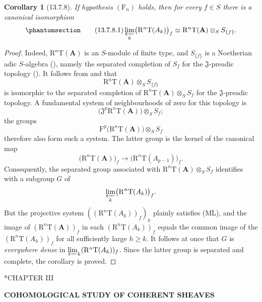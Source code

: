 \documentclass[oneside]{amsart}
\makeatletter
\theoremstyle{ega-env-style}
\theoremstyle{ega-thm-env-style}
\newtheorem*{corollary}{Corollary}
\theoremstyle{ega-defn-env-style}
\def\section{\@startsection{section}{1}%
  \z@{.7\linespacing\@plus\linespacing}{.5\linespacing}%
  {\normalfont\bfseries\Large\scshape\centering}}
\def\bb{\mathbf}                    %
\def\geq{\geqslant}                 %
\def\RR{\mathrm{R}}                 %
\def\isoto{\simeq} %
\newcommand{\oldpage}[2][]{{\marginnote{\normalfont{\textbf{#1}~|~#2}}}\ignorespaces}
\let\EGAOriginalLabel\label
\renewcommand{\label}[1]{\phantomsection\EGAOriginalLabel{#1}}
\makeatother
\begin{document}
\begin{corollary}[13.7.8]
\label{0.13.7.8}
If hypothesis $(\mathrm{F}_n)$ holds, then for every $f\in S$ there
is a canonical isomorphism
\begin{equation}
\label{0.13.7.8.1}
\tag{13.7.8.1}
  \varprojlim_k\bigl(\RR^n\mathrm{T}(A_k)\bigr)_f
  \isoto
  \RR^n\mathrm{T}(\bb{A})\otimes_S S_{\{f\}}.
\end{equation}
\end{corollary}

\begin{proof}
Indeed, $\RR^n\mathrm{T}(\bb{A})$ is an $S$-module of finite type,
and $S_{\{f\}}$ is a Noetherian adic $S$-algebra
(), namely the separated
completion of $S_f$ for the $\mathfrak{J}$-preadic topology
().
It follows from  and
 that
\[
  \RR^n\mathrm{T}(\bb{A})\otimes_S S_{\{f\}}
\]
is isomorphic to the separated completion of
$\RR^n\mathrm{T}(\bb{A})\otimes_S S_f$ for the
$\mathfrak{J}$-preadic topology.
A fundamental system of neighbourhoods of zero for this topology
is
\[
  \bigl(
    \mathfrak{J}^p\RR^n\mathrm{T}(\bb{A})
  \bigr)\otimes_S S_f;
\]
the groups
\[
  \mathrm{F}^p\bigl(\RR^n\mathrm{T}(\bb{A})\bigr)
  \otimes_S S_f
\]
therefore also form such a system.
The latter group is the kernel of the canonical map
\[
  \bigl(\RR^n\mathrm{T}(\bb{A})\bigr)_f
  \longrightarrow
  \bigl(\RR^n\mathrm{T}(A_{p-1})\bigr)_f.
\]
Consequently, the separated group associated with
$\RR^n\mathrm{T}(\bb{A})\otimes_S S_f$ identifies with a subgroup
$G$ of
\[
  \varprojlim_k\bigl(\RR^n\mathrm{T}(A_k)\bigr)_f.
\]
But the projective system
$((\RR^n\mathrm{T}(A_k))_f)_k$ plainly satisfies {\rm(ML)}, and the
image of $(\RR^n\mathrm{T}(\bb{A}))_f$ in each
$(\RR^n\mathrm{T}(A_k))_f$ equals the common image of the
$(\RR^n\mathrm{T}(A_h))_f$ for all sufficiently large $h\geq k$.
It follows at once that $G$ is \emph{everywhere dense} in
$\varprojlim_k(\RR^n\mathrm{T}(A_k))_f$.
Since the latter group is separated and complete, the corollary is
proved.
\end{proof}
 
\clearpage
{}
\label{section:ega3}
\section*{CHAPTER III}
\setcounter{section}{0}
\setcounter{subsection}{0}
\setcounter{equation}{0}
\begin{center}
\Large\bfseries COHOMOLOGICAL STUDY OF COHERENT SHEAVES
\end{center}
\oldpage[III]{81}
\end{document}
